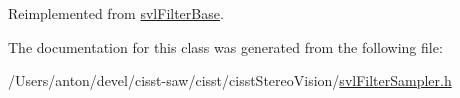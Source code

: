 Reimplemented from \hyperlink{classsvl_filter_base_ab689b852e2cee497fcd0ca6708105e17}{svl\+Filter\+Base}.



The documentation for this class was generated from the following file\+:\begin{DoxyCompactItemize}
\item 
/\+Users/anton/devel/cisst-\/saw/cisst/cisst\+Stereo\+Vision/\hyperlink{svl_filter_sampler_8h}{svl\+Filter\+Sampler.\+h}\end{DoxyCompactItemize}
